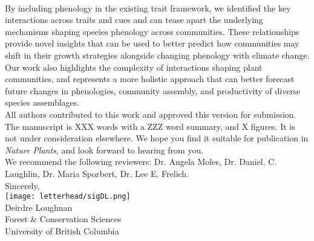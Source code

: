\documentclass[11pt,a4paper]{article}
\begin{document}
\vspace{1.5ex}\\
\noindent By including phenology in the existing trait framework, we identified the key interactions across traits and cues and can tease apart the underlying mechanisms shaping species phenology across communities. These relationships provide novel insights that can be used to better predict how communities may shift in their growth strategies alongside changing phenology with climate change. Our work also highlights the complexity of interactions shaping plant communities, and represents a more holistic approach that can better forecast future changes in phenologies, community assembly, and productivity of diverse species assemblages.
\vspace{1.5ex}\\
\noindent All authors contributed to this work and approved this version for submission. The manuscript is XXX words with a ZZZ word summary, and X figures. It is not under consideration elsewhere. We hope you find it suitable for publication in \emph{Nature Plants}, and look forward to hearing from you. 
\vspace{1.5ex}\\
\noindent We recommend the following reviewers: Dr. Angela Moles,  Dr. Daniel. C. Laughlin, Dr. Maria Sporbert, Dr. Lee E. Frelich.
\vspace{1.5ex}\\
\noindent Sincerely, \\
\texttt{[image: letterhead/sigDL.png]} \\
\noindent Deirdre Loughnan\\
\noindent Forest \& Conservation Sciences\\
\noindent University of British Columbia

\newpage

\vspace{-5ex}
% 


\newpage
\end{document}
